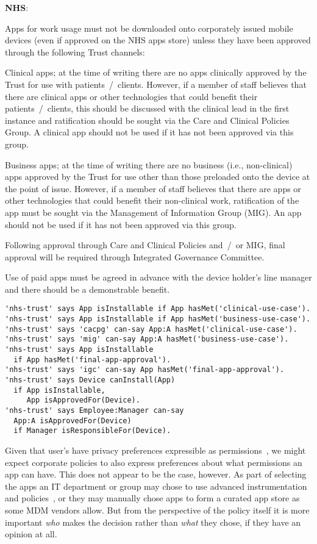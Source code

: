 \documentclass{easychair}
\newenvironment{policyrule}[1]{%
  \begin{mdframed}\footnotesize
      \noindent\textbf{\sffamily #1}:~\itshape%
}{%
  \end{mdframed}
}
\begin{document}
\begin{policyrule}{NHS}
  Apps for work usage must not be downloaded onto corporately issued
  mobile devices (even if approved on the NHS apps store) unless they have
  been approved through the following Trust channels:
  
  Clinical apps; at the time of writing there are no apps clinically
  approved by the Trust for use with patients~/~clients. However, if a
  member of staff believes that there are clinical apps or other
  technologies that could benefit their patients~/~clients, this should be
  discussed with the clinical lead in the first instance and ratification
  should be sought via the Care and Clinical Policies Group. A clinical
  app should not be used if it has not been approved via this group.
  
  Business apps; at the time of writing there are no business (i.e.,
  non-clinical) apps approved by the Trust for use other than those
  preloaded onto the device at the point of issue. However, if a member of
  staff believes that there are apps or other technologies that could
  benefit their non-clinical work, ratification of the app must be sought
  via the Management of Information Group (MIG). An app should not be used
  if it has not been approved via this group.

  Following approval through Care and Clinical Policies and~/~or MIG, final
  approval will be required through Integrated Governance Committee.

  Use of paid apps must be agreed in advance with the device holder's line
  manager and there should be a demonstrable benefit.
  \normalfont
  \begin{lstlisting}
'nhs-trust' says App isInstallable if App hasMet('clinical-use-case').
'nhs-trust' says App isInstallable if App hasMet('business-use-case').
'nhs-trust' says 'cacpg' can-say App:A hasMet('clinical-use-case').
'nhs-trust' says 'mig' can-say App:A hasMet('business-use-case').
'nhs-trust' says App isInstallable
  if App hasMet('final-app-approval').
'nhs-trust' says 'igc' can-say App hasMet('final-app-approval').
'nhs-trust' says Device canInstall(App)
  if App isInstallable,
     App isApprovedFor(Device).
'nhs-trust' says Employee:Manager can-say
  App:A isApprovedFor(Device)
  if Manager isResponsibleFor(Device).
  \end{lstlisting}
\end{policyrule}
Given that user's have privacy preferences expressible as permissions~\cite{lin_modeling_2014}, we might expect corporate policies to also express preferences about what permissions an app can have.
This does not appear to be the case, however. 
As part of selecting the apps an IT department or group may chose to use advanced instrumentation and policies~\cite{armando_enabling_2014}, or they may manually chose apps to form a curated app store as some \ac{MDM} vendors allow.
But from the perspective of the policy itself it is more important \emph{who} makes the decision rather than \emph{what} they chose, if they have an opinion at all.
\end{document}
